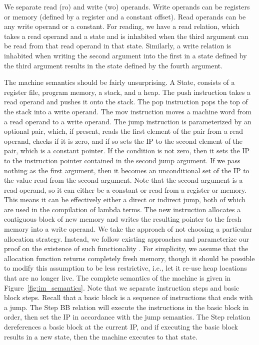 We separate read (ro) and write (wo) operands. Write operands can be registers
or memory (defined by a register and a constant offset). Read operands can be
any write operand or a constant. For reading, we have a read relation, which
takes a read operand and a state and is inhabited when the third argument can be
read from that read operand in that state. Similarly, a write relation is
inhabited when writing the second argument into the first in a state defined by
the third argument results in the state defined by the fourth argument.  

The machine semantics should be fairly unsurprising. A State, consists of a
register file, program memory, a stack, and a heap. The push instruction takes a
read operand and pushes it onto the stack. The pop instruction pops the
top of the stack into a write operand. The mov instruction moves a machine word
from a read operand to a write operand. The jump instruction is parameterized by
an optional pair, which, if present, reads the first element of the pair from a
read operand, checks if it is zero, and if so sets the IP to the second element
of the pair, which is a constant pointer. If the condition is not zero, then it
sets the IP to the instruction pointer contained in the second jump argument. If
we pass nothing as the first argument, then it becomes an unconditional set of
the IP to the value read from the second argument.  Note that the second
argument is a read operand, so it can either be a constant or read from a register
or memory. This means it can be effectively either a direct or indirect jump,
both of which are used in the compilation of lambda terms. The new instruction
allocates a contiguous block of new memory and writes the resulting pointer to
the fresh memory into a write operand. We take the approach of not choosing a
particular allocation strategy. Instead, we follow existing approaches and
parameterize our proof on the existence of such functionality
\cite{chlipala2007certified}. For simplicity, we assume that the allocation
function returns completely fresh memory, though it should be possible to modify
this assumption to be less restrictive, i.e., let it re-use heap locations that
are no longer live. The complete semantics of the machine is given in
Figure~\ref{fig:im_semantics}.  Note that we separate instruction steps and
basic block steps. Recall that a basic block is a sequence of instructions that
ends with a jump. The Step BB relation will execute the instructions
in the basic block in order, then set the IP in accordance with the
jump semantics. The Step relation dereferences a basic block at the current IP,
and if executing the basic block results in a new state, then the machine
executes to that state. 

